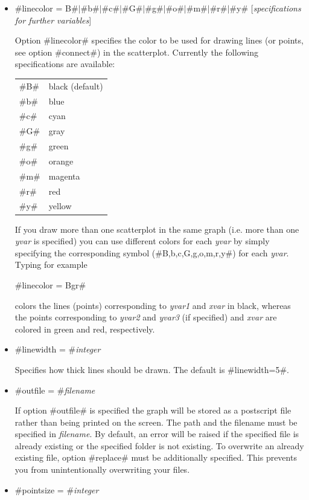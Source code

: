 \begin{itemize}
 \item #linecolor = B#$|$#b#$|$#c#$|$#G#$|$#g#$|$#o#$|$#m#$|$#r#$|$#y# [{\em specifications
for further variables}]

Option #linecolor# specifies the color to be used for drawing
lines (or points, see option #connect#) in the scatterplot.
Currently the following specifications are available:

\begin{tabular}{ll}
#B# & black (default) \\
#b# & blue \\
#c# & cyan \\
#G# & gray \\
#g# & green \\
#o# & orange \\
#m# & magenta \\
#r# & red \\
#y# & yellow \\
\end{tabular}

If you draw more than one scatterplot in the same graph (i.e. more
than one {\em yvar} is specified) you can use different colors for
each {\em yvar} by simply specifying the corresponding symbol
(#B,b,c,G,g,o,m,r,y#) for each {\em yvar}. Typing for example

#linecolor = Bgr#

colors the lines (points) corresponding to {\em yvar1} and {\em
xvar} in black, whereas the points corresponding to {\em yvar2}
and {\em yvar3} (if specified) and {\em xvar} are colored in green
and red, respectively.

\item #linewidth = #{\em integer}

Specifies how thick lines should be drawn. The default is
#linewidth=5#.

\item #outfile = #{\em filename}

If option #outfile# is specified the graph will be stored as a
postscript file rather than being printed on the screen. The path
and the filename must be specified in {\em filename}. By default,
an error will be raised if the specified file is already existing
or the specified folder is not existing. To overwrite  an already
existing file, option #replace# must be additionally specified.
This prevents you from unintentionally overwriting your files.

\item #pointsize = #{\em integer}


\end{itemize}
